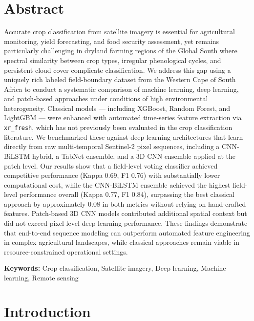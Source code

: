 \documentclass[pdflatex,sn-mathphys]{sn-jnl} %
\begin{document}
\vspace{1em}
\section*{Abstract}
\noindent
Accurate crop classification from satellite imagery is essential for agricultural monitoring, yield forecasting, and food security assessment, yet remains particularly challenging in dryland farming regions of the Global South where spectral similarity between crop types, irregular phenological cycles, and persistent cloud cover complicate classification. We address this gap using a uniquely rich labeled field-boundary dataset from the Western Cape of South Africa to conduct a systematic comparison of machine learning, deep learning, and patch-based approaches under conditions of high environmental heterogeneity. Classical models — including XGBoost, Random Forest, and LightGBM — were enhanced with automated time-series feature extraction via \texttt{xr\_fresh}, which has not previously been evaluated in the crop classification literature. We benchmarked these against deep learning architectures that learn directly from raw multi-temporal Sentinel-2 pixel sequences, including a CNN-BiLSTM hybrid, a TabNet ensemble, and a 3D CNN ensemble applied at the patch level. Our results show that a field-level voting classifier achieved competitive performance (Kappa 0.69, F1 0.76) with substantially lower computational cost, while the CNN-BiLSTM ensemble achieved the highest field-level performance overall (Kappa 0.77, F1 0.84), surpassing the best classical approach by approximately 0.08 in both metrics without relying on hand-crafted features. Patch-based 3D CNN models contributed additional spatial context but did not exceed pixel-level deep learning performance. These findings demonstrate that end-to-end sequence modeling can outperform automated feature engineering in complex agricultural landscapes, while classical approaches remain viable in resource-constrained operational settings.


\vspace{1em}
\noindent\textbf{Keywords:} Crop classification, Satellite imagery, Deep learning, Machine learning, Remote sensing

\section{Introduction}
\end{document}
